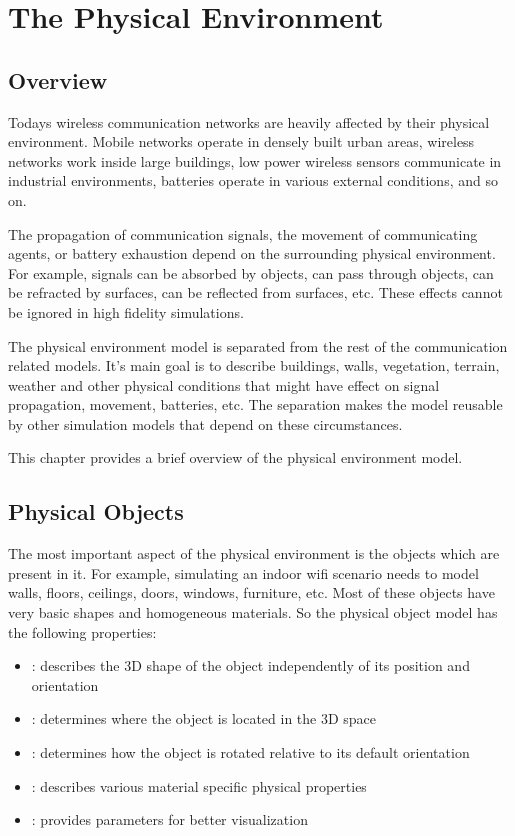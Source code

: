 \chapter{The Physical Environment}
\label{cha:environment}

\section{Overview}

Todays wireless communication networks are heavily affected by their physical
environment. Mobile networks operate in densely built urban areas, wireless
networks work inside large buildings, low power wireless sensors communicate
in industrial environments, batteries operate in various external conditions,
and so on.

The propagation of communication signals, the movement of communicating agents,
or battery exhaustion depend on the surrounding physical environment. For
example, signals can be absorbed by objects, can pass through objects, can be
refracted by surfaces, can be reflected from surfaces, etc. These effects cannot
be ignored in high fidelity simulations.

The physical environment model is separated from the rest of the communication
related models. It's main goal is to describe buildings, walls, vegetation,
terrain, weather and other physical conditions that might have effect on signal
propagation, movement, batteries, etc. The separation makes the model reusable
by other simulation models that depend on these circumstances.

This chapter provides a brief overview of the physical environment model. 

\section{Physical Objects}

The most important aspect of the physical environment is the objects which are
present in it. For example, simulating an indoor wifi scenario needs to model
walls, floors, ceilings, doors, windows, furniture, etc. Most of these objects
have very basic shapes and homogeneous materials. So the physical object model
has the following properties:

\begin{itemize}
  \item {}: describes the 3D shape of the object independently of its
position and orientation
  \item {}: determines where the object is located in the 3D space
  \item {}: determines how the object is rotated relative to its
default orientation
  \item {}: describes various material specific physical properties  
  \item {}: provides parameters for better visualization
\end{itemize}

